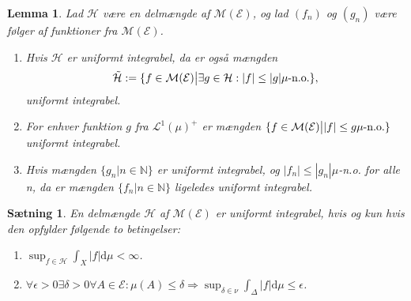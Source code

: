 \documentclass{article}
\newcommand{\N}{\mathbb{N}}
\newcommand{\1}{\mathbbm{1}}
\newcommand{\lclass}{\mathcal{L}}
\newtheorem{lemma}[theorem]{Lemma}
\newtheorem{proposition}[theorem]{Sætning}
\theoremstyle{boxed}
\begin{document}
\begin{theorem-box}
    \begin{lemma}
        Lad $\mathcal{H}$ være en delmængde af $\mathcal{M}(\mathcal{E})$, og lad $(f_n)$ og $(g_n)$ være følger af funktioner fra $\mathcal{M}(\mathcal{E})$.
        \begin{enumerate}
            \item[\textnormal{(i)}] Hvis $\mathcal{H}$ er uniformt integrabel, da er også mængden 
            $$\tilde{\mathcal{H}}:=\{f\in\mathcal{M}(\mathcal{E})\big{|}\exists g\in\mathcal{H}:|f|\leq |g| \mu\text{-n.o.}\},$$
            uniformt integrabel.
            \item[\textnormal{(ii)}] For enhver funktion $g$ fra $\lclass^1(\mu)^+$ er mængden $\{f\in\mathcal{M}(\mathcal{E})\big{|}|f|\leq g \mu\text{-n.o.}\}$ uniformt integrabel.
            \item[\textnormal{(iii)}] Hvis mængden $\{g_n|n\in\N\}$ er uniformt integrabel, og $|f_n|\leq|g_n| \mu$-n.o. for alle n, da er mængden $\{f_n|n\in\N\}$ ligeledes uniformt integrabel.
        \end{enumerate}
    \end{lemma}
\end{theorem-box}
\begin{theorem-box}
    \begin{proposition}
        En delmængde $\mathcal{H}$ af $\mathcal{M}(\mathcal{E})$ er uniformt integrabel, hvis og kun hvis den opfylder følgende to betingelser:
        \begin{enumerate}
            \item[\textnormal{(i)}]$\sup _{f \in \mathcal{H}} \int_X|f| \mathrm{d} \mu<\infty$.
            \item[\textnormal{(ii)}] $\forall \epsilon>0 \exists \delta>0 \forall A \in \mathcal{E}: \mu(A) \leq \delta \Longrightarrow \sup _{\delta \in \nu} \int_{\Delta}|f| \mathrm{d} \mu \leq \epsilon$.
        \end{enumerate}
    \end{proposition}
\end{theorem-box}
\end{document}
